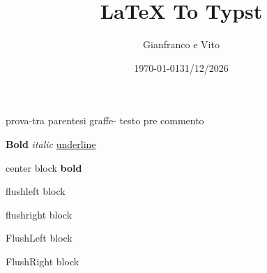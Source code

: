\documentclass{article}
\title{LaTeX To Typst}
\author{Gianfranco e Vito}
\date{\today}
\date{31/12/2026}
\begin{document}
\maketitle
\tableofcontents

prova{-tra parentesi graffe-}
testo pre commento %

\textbf{Bold}
\textit{italic}
\underline{underline}

\centering
\raggedright
\raggedleft
\flushright
\flushleft
\usepackage{ragged2e}
\begin{center}
    center block \textbf{bold}
\end{center}
\begin{flushleft} flushleft block \end{flushleft}
\begin{flushright} flushright block \end{flushright}
\begin{FlushLeft} FlushLeft block \end{FlushLeft}
\begin{FlushRight} FlushRight block \end{FlushRight}

\\
\newline
\break
\hfill
\vfill
\pagebreak
\newpage
\clearpage
\end{document}
